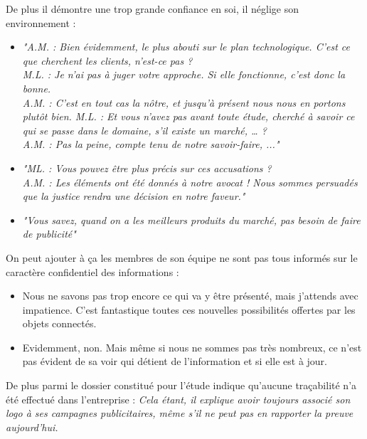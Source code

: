 De plus il démontre une trop grande confiance en soi, il néglige son environnement :
\begin{itemize}
\item \emph{"A.M. : Bien évidemment, le plus abouti sur le plan technologique. C’est ce que cherchent les clients, n’est-ce pas ?\\
M.L. : Je n’ai pas à juger votre approche. Si elle fonctionne, c’est donc la bonne.\\
A.M. : C’est en tout cas la nôtre, et jusqu’à présent nous nous en portons plutôt bien.
M.L. : Et vous n’avez pas avant toute étude, cherché à savoir ce qui se passe dans le domaine, s’il existe un marché, … ?\\
A.M. : Pas la peine, compte tenu de notre savoir-faire, ..."}
\item \emph{"ML. : Vous pouvez être plus précis sur ces accusations ?\\
A.M. : Les éléments ont été donnés à notre avocat ! Nous sommes persuadés que la justice rendra une
décision en notre faveur."}
\item \emph{"Vous savez, quand on a les meilleurs produits du marché, pas besoin de faire de publicité"}
\end{itemize}

On peut ajouter à ça les membres de son équipe ne sont pas tous informés sur le caractère confidentiel des informations : 
\begin{itemize}
\item Nous ne savons pas trop encore ce qui va y être présenté, mais j’attends avec impatience. C’est fantastique toutes ces nouvelles possibilités offertes par les objets connectés.
\item Evidemment, non. Mais même si nous ne sommes pas très nombreux, ce n’est pas évident de sa
voir qui détient de l’information et si elle est à jour.
\end{itemize}

De plus parmi le dossier constitué pour l'étude indique qu'aucune traçabilité n'a été effectué dans l'entreprise : \emph{ Cela étant, il explique avoir toujours associé son logo à ses campagnes publicitaires, même s’il ne peut pas en rapporter la preuve aujourd’hui.}

